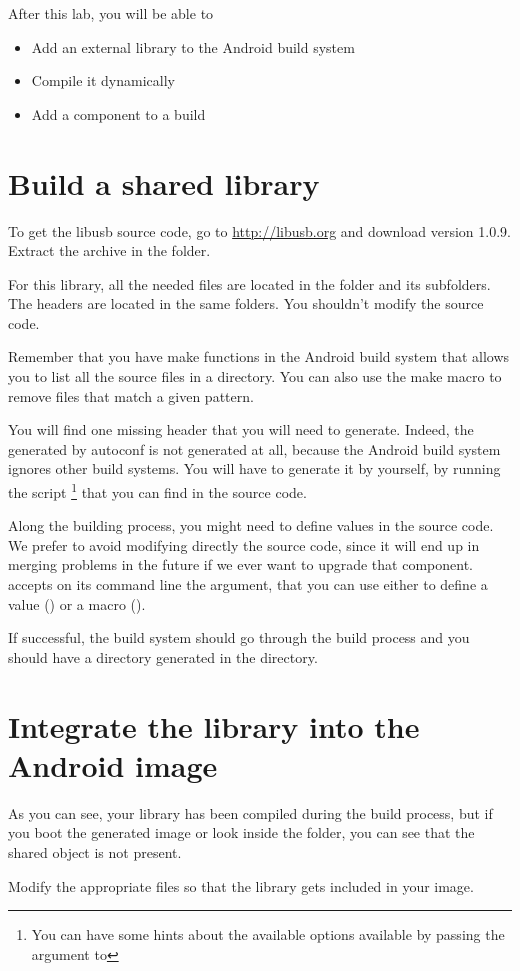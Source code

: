 
After this lab, you will be able to
\begin{itemize}
  \item Add an external library to the Android build system
  \item Compile it dynamically
  \item Add a component to a build
\end{itemize}

\section{Build a shared library}

To get the libusb source code, go to \url{http://libusb.org} and
download version 1.0.9. Extract the archive in the
 folder.

For this library, all the needed  files are located in the
 folder and its subfolders. The headers are located in
the same folders. You shouldn't modify the  source code.

Remember that you have make functions in the Android build system that
allows you to list all the source files in a directory. You can also
use the  make macro to remove files that match a
given pattern.

You will find one missing header that you will need to
generate. Indeed, the  generated by autoconf is not
generated at all, because the Android build system ignores other build
systems. You will have to generate it by yourself, by running the
 script \footnote{You can have some hints about the
  available options available by passing the  argument to
  } that you can find in the  source
code.

Along the building process, you might need to define values in the
source code. We prefer to avoid modifying directly the source code,
since it will end up in merging problems in the future if we ever want
to upgrade that component.  accepts on its command line the
 argument, that you can use either to define a value
() or a macro ().

If successful, the build system should go through the build process
and you should have a directory generated in the  directory.

\section{Integrate the library into the Android image}

As you can see, your library has been compiled during the build
process, but if you boot the generated image or look inside the
folder, you can see that the shared object is not present.

Modify the appropriate files so that the library gets included in your
image.
